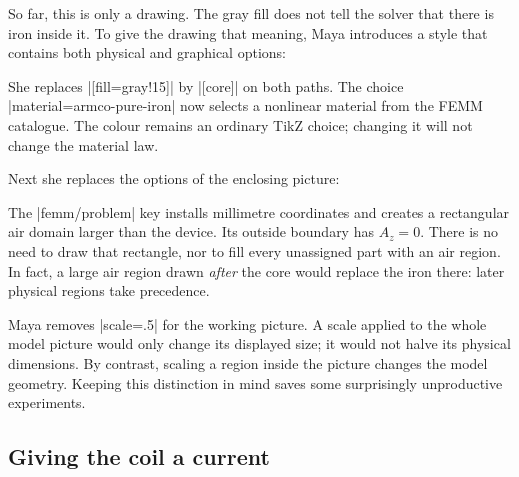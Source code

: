 So far, this is only a drawing. The gray fill does not tell the solver that
there is iron inside it. To give the drawing that meaning, Maya introduces
a style that contains both physical and graphical options:
\begin{codeexample}
\end{codeexample}
She replaces |[fill=gray!15]| by |[core]| on both paths. The choice
|material=armco-pure-iron| now selects a nonlinear material from the FEMM catalogue.
The colour remains an ordinary TikZ choice; changing it will not change the
material law.

Next she replaces the options of the enclosing picture:
\begin{codeexample}
\begin{tikzpicture}[femm/problem={xmin=-110,xmax=110,
  ymin=-95,ymax=115,mesh size=5}]
\end{tikzpicture}
\end{codeexample}
The |femm/problem| key installs millimetre coordinates and creates a rectangular
air domain larger than the device. Its outside boundary has $A_z=0$.
There is no need to draw that rectangle, nor to fill every unassigned part
with an air region. In fact, a large air region drawn \emph{after} the core
would replace the iron there: later physical regions take precedence.

Maya removes |scale=.5| for the working picture. A scale applied to the whole
model picture would only change its displayed size; it would not halve its
physical dimensions. By contrast, scaling a region inside the picture changes
the model geometry. Keeping this distinction in mind saves some surprisingly
unproductive experiments.

\subsection{Giving the coil a current}

